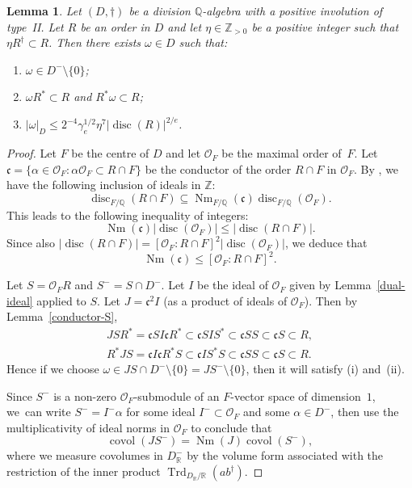 \documentclass[11pt]{article}
\numberwithin{equation}{section}
\newenvironment{enumeratei}
{\bgroup\def\theenumi{\roman{enumi}}\def\theenumii{\alph{enumii}}\begin{enumerate}}
{\end{enumerate}\egroup}
\newcommand{\bQ}{\mathbb{Q}}
\newcommand{\bR}{\mathbb{R}}
\newcommand{\bZ}{\mathbb{Z}}
\newcommand{\cO}{\mathcal{O}}
\newcommand{\fc}{\mathfrak{c}}
\DeclareMathOperator{\covol}{covol}
\DeclareMathOperator{\disc}{disc}
\DeclareMathOperator{\Nm}{Nm}
\DeclareMathOperator{\Trd}{Trd}
\newcommand{\abs}[1]{\lvert #1 \rvert}
\newtheorem{lemma}{Lemma}[section]
\begin{document}
\begin{lemma} \label{small-antisymm-star}
Let $(D, \dag)$ be a division $\bQ$-algebra with a positive involution of type~II.
Let $R$ be an order in $D$ and let $\eta \in \bZ_{>0}$ be a positive integer such that $\eta R^\dag \subset R$.
Then there exists $\omega \in D$ such that:
\begin{enumeratei}
\item $\omega \in D^- \setminus \{0\}$;
\item $\omega R^* \subset R$ and $R^* \omega \subset R$;
\item $\abs{\omega}_D \leq 2^{-4} \gamma_e^{1/2} \eta^7 \abs{\disc(R)}^{2/e}$.
\end{enumeratei}
\end{lemma}

\begin{proof}
Let $F$ be the centre of $D$ and let $\cO_F$ be the maximal order of~$F$.
Let $\fc\!=\!\{\alpha\!\in\!\cO_F:\alpha\cO_F\!\subset\! R{\cap} F\}$ be the conductor of the order $R \cap F$ in $\cO_F$.
By \hbox{\cite[(2)]{DCD00}}, we have the following inclusion of ideals in $\bZ$:
\[
\disc_{F/\bQ}(R \cap F) \subseteq \Nm_{F/\bQ}(\fc) \disc_{F/\bQ}(\cO_F).
\]
This leads to the following inequality of integers:
\[
\Nm(\fc) \abs{\disc(\cO_F)} \leq \abs{\disc(R \cap F)}.
\]
Since also $\abs{\disc(R \cap F)} = [\cO_F : R \cap F]^2 \abs{\disc(\cO_F)}$, we deduce that
\[
\Nm(\fc) \leq [\cO_F : R \cap F]^2.
\]

Let $S = \cO_F R$ and $S^- = S \cap D^-$.
Let $I$ be the ideal of $\cO_F$ given by Lemma~\ref{dual-ideal} applied to $S$.
Let $J = \fc^2 I$ (as a product of ideals of $\cO_F$).
Then by Lemma~\ref{conductor-S},
\begin{gather*}
JSR^* = \fc SI \fc R^* \subset \fc SIS^* \subset \fc SS \subset \fc S \subset R,
\\ R^*JS = \fc I \fc R^* S \subset \fc IS^*S \subset \fc SS \subset \fc S \subset R.
\end{gather*}
Hence if we choose $\omega \in JS \cap D^- \setminus \{0\} = JS^- \setminus \{ 0 \}$, then it will satisfy (i) and~(ii).

Since $S^-$ is a non-zero $\cO_F$-submodule of an $F$-vector space of dimension~$1$, we~can write $S^- = I^-\alpha$ for some ideal $I^- \subset \cO_F$ and some $\alpha \in D^-$, then use the multiplicativity of ideal norms in $\cO_F$ to conclude that
\[
\covol(JS^-) = \Nm(J) \covol(S^-),
\]
where we measure covolumes in $D_\bR^-$ by the volume form associated with the restriction of the inner product $\Trd_{D_\bR/\bR}(ab^\dag)$.


\end{proof}
\end{document}
